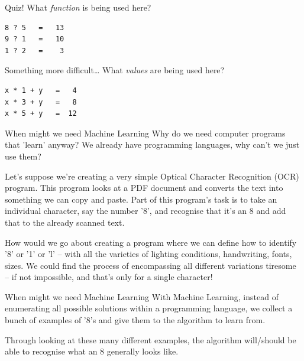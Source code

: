 \documentclass[10pt]{beamer}
\begin{document}
\begin{frame}[label={sec:org9b6937b},fragile]{Quiz!}
 What \emph{function} is being used here?

\begin{verbatim}
8 ? 5   =   13
9 ? 1   =   10
1 ? 2   =    3
\end{verbatim}
\end{frame}

\begin{frame}[label={sec:orgcddaa9c},fragile]{Something more difficult\ldots{}}
 What \emph{values} are being used here?

\begin{verbatim}
x * 1 + y   =   4
x * 3 + y   =   8
x * 5 + y   =  12
\end{verbatim}
\end{frame}


\begin{frame}[label={sec:org96e0f33}]{When might we need Machine Learning}
Why do we need computer programs that 'learn' anyway? We already have programming
languages, why can't we just use them?

Let's suppose we're creating a very simple Optical Character Recognition (OCR)
program. This program looks at a PDF document and converts the text into something we
can copy and paste. Part of this program's task is to take an individual character,
say the number '8', and recognise that it's an 8 and add that to the already scanned
text.

How would we go about creating a program where we can define how to identify '8' or
'1' or 'l' -- with all the varieties of lighting conditions, handwriting, fonts,
sizes. We could find the process of encompassing all different variations tiresome --
if not impossible, and that's only for a single character!
\end{frame}

\begin{frame}[label={sec:org153a90f}]{When might we need Machine Learning}
With Machine Learning, instead of enumerating all possible solutions within a
programming language, we collect a bunch of examples of '8's and give them to the
algorithm to learn from.

Through looking at these many different examples, the algorithm will/should be able
to recognise what an 8 generally looks like.
\end{frame}
\end{document}
